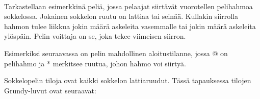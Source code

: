 ~\\
\noindent
Tarkastellaan esimerkkinä peliä,
jossa pelaajat siirtävät vuorotellen
pelihahmoa sokkelossa.
Jokainen sokkelon ruutu on lattiaa tai seinää.
Kullakin siirrolla hahmon tulee liikkua jokin
määrä askeleita vasemmalle tai jokin
määrä askeleita ylöspäin.
Pelin voittaja on se, joka tekee viimeisen siirron.

\begin{samepage}
Esimerkiksi seuraavassa on pelin mahdollinen aloitustilanne,
jossa @ on pelihahmo ja * merkitsee ruutua, johon hahmo voi siirtyä.

\begin{center}
\end{center}
\end{samepage}

Sokkelopelin tiloja ovat kaikki sokkelon
lattiaruudut. Tässä tapauksessa
tilojen Grundy-luvut ovat seuraavat:

